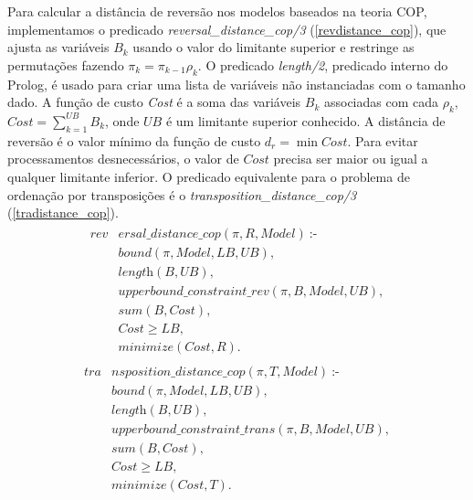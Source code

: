 Para calcular a distância de reversão nos modelos baseados na teoria
COP, implementamos o predicado \textit{reversal\_distance\_cop/3}
(\ref{revdistance_cop}), que ajusta as variáveis $B_k$ usando o valor do
limitante superior e restringe as permutações fazendo $\pi_{k} =
\pi_{k-1} \rho_{k}$. O predicado \textit{length/2}, predicado interno do
Prolog, é usado para criar uma lista de variáveis não instanciadas com o
tamanho dado. A função de custo \textit{Cost} é a soma das variáveis
$B_k$ associadas com cada $\rho_{k}$, $Cost = \sum_{k=1}^{UB} B_{k}$,
onde $UB$ é um limitante superior conhecido. A distância de reversão é o
valor mínimo da função de custo $d_{r} = \min Cost$. Para evitar
processamentos desnecessários, o valor de $Cost$ precisa ser maior ou
igual a qualquer limitante inferior. O predicado equivalente para o
problema de ordenação por transposições é o
\textit{transposition\_distance\_cop/3} (\ref{tradistance_cop}).
\begin{align}
  \label{revdistance_cop}
  \begin{split}
  \textit{rev}&\textit{ersal\_distance\_cop}(\pi, R, Model)~\text{:-} \\
  &\textit{bound}(\pi, Model, LB, UB), \\
  &\textit{length}(B, UB),  \\
  &\textit{upperbound\_constraint\_rev}(\pi, B, Model, UB), \\
  &\textit{sum}(B, Cost),  \\
  &\textit{Cost} \ge \textit{LB},  \\
  &\textit{minimize}(Cost, R). 
  \end{split}
\end{align}
\begin{align}
  \label{tradistance_cop}
  \begin{split}
  \textit{tra}&\textit{nsposition\_distance\_cop}(\pi, T, Model)~\text{:-} \\
  &\textit{bound}(\pi, Model, LB, UB), \\
  &\textit{length}(B, UB),  \\
  &\textit{upperbound\_constraint\_trans}(\pi, B, Model, UB), \\
  &\textit{sum}(B, Cost),  \\
  &\textit{Cost} \ge \textit{LB},  \\
  &\textit{minimize}(Cost, T). 
  \end{split}
\end{align}

